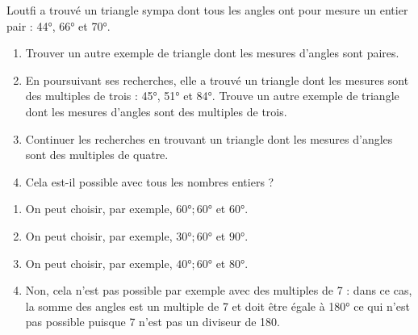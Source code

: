 \begin{exercice*}
   Loutfi a trouvé un triangle sympa dont tous les angles ont pour mesure un entier pair : \ang{44}, \ang{66} et \ang{70}.
   \begin{enumerate}
      \item Trouver un autre exemple de triangle dont les mesures d'angles sont paires.
      \item En poursuivant ses recherches, elle a trouvé un triangle dont les mesures sont des multiples de trois : \ang{45}, \ang{51} et \ang{84}. Trouve un autre exemple de triangle dont les mesures d'angles sont des multiples de trois.
      \item Continuer les recherches en trouvant un triangle dont les mesures d'angles sont des multiples de quatre.
      \item Cela est-il possible avec tous les nombres entiers ?
   \end{enumerate}
\end{exercice*}
\begin{corrige}
   \begin{enumerate}
      \item On peut choisir, par exemple, {\red $\ang{60} ; \ang{60}$ et $\ang{60}$}.
      \item On peut choisir, par exemple, {\red $\ang{30} ; \ang{60}$ et $\ang{90}$}.
      \item On peut choisir, par exemple, {\red $\ang{40} ; \ang{60}$ et $\ang{80}$}.
      \item {\red Non}, cela n'est pas possible par exemple avec des multiples de 7 : dans ce cas, la somme des angles est un multiple de 7 et doit être égale à \ang{180} ce qui n'est pas possible puisque 7 n'est pas un diviseur de 180.
   \end{enumerate}
\end{corrige}

